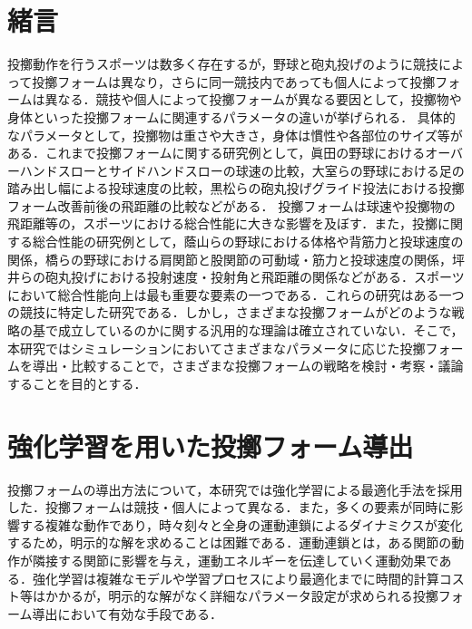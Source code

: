 \begin{small}

\section{緒言}
投擲動作を行うスポーツは数多く存在するが，野球と砲丸投げのように競技によって投擲フォームは異なり，さらに同一競技内であっても個人によって投擲フォームは異なる．競技や個人によって投擲フォームが異なる要因として，投擲物や身体といった投擲フォームに関連するパラメータの違いが挙げられる．
具体的なパラメータとして，投擲物は重さや大きさ，身体は慣性や各部位のサイズ等がある．これまで投擲フォームに関する研究例として，眞田の野球におけるオーバーハンドスローとサイドハンドスローの球速の比較\cite{sanada}，大室らの野球における足の踏み出し幅による投球速度の比較\cite{omuro}，黒松らの砲丸投げグライド投法における投擲フォーム改善前後の飛距離の比較\cite{kuromatsu}などがある．
投擲フォームは球速や投擲物の飛距離等の，スポーツにおける総合性能に大きな影響を及ぼす．また，投擲に関する総合性能の研究例として，蔭山らの野球における体格や背筋力と投球速度の関係\cite{kageyama}，橋らの野球における肩関節と股関節の可動域・筋力と投球速度の関係\cite{takahashi}，坪井らの砲丸投げにおける投射速度・投射角と飛距離の関係\cite{tsuboi}などがある．スポーツにおいて総合性能向上は最も重要な要素の一つである．これらの研究はある一つの競技に特定した研究である．しかし，さまざまな投擲フォームがどのような戦略の基で成立しているのかに関する汎用的な理論は確立されていない．そこで，本研究ではシミュレーションにおいてさまざまなパラメータに応じた投擲フォームを導出・比較することで，さまざまな投擲フォームの戦略を検討・考察・議論することを目的とする．\\
\section{強化学習を用いた投擲フォーム導出}
投擲フォームの導出方法について，本研究では強化学習による最適化手法を採用した．投擲フォームは競技・個人によって異なる．また，多くの要素が同時に影響する複雑な動作であり，時々刻々と全身の運動連鎖\cite{iwasako}\cite{burkhart}によるダイナミクスが変化するため，明示的な解を求めることは困難である．運動連鎖とは，ある関節の動作が隣接する関節に影響を与え，運動エネルギーを伝達していく運動効果である．強化学習は複雑なモデルや学習プロセスにより最適化までに時間的計算コスト等はかかるが，明示的な解がなく詳細なパラメータ設定が求められる投擲フォーム導出において有効な手段である．

\end{small}

